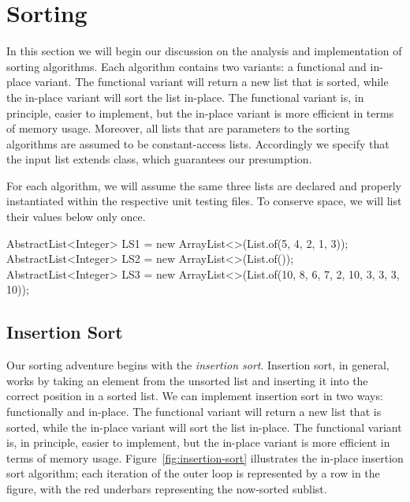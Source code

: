 \section{Sorting}
In this section we will begin our discussion on the analysis and implementation of sorting algorithms. Each algorithm contains two variants: a functional and in-place variant. The functional variant will return a new list that is sorted, while the in-place variant will sort the list in-place. The functional variant is, in principle, easier to implement, but the in-place variant is more efficient in terms of memory usage. Moreover, all lists that are parameters to the sorting algorithms are assumed to be constant-access lists. Accordingly we specify that the input list extends  class, which guarantees our presumption.

For each algorithm, we will assume the same three lists are declared and properly instantiated within the respective unit testing files. To conserve space, we will list their values below only once.

\begin{verbnobox}[\small]
AbstractList<Integer> LS1 = 
  new ArrayList<>(List.of(5, 4, 2, 1, 3));
AbstractList<Integer> LS2 = 
  new ArrayList<>(List.of());
AbstractList<Integer> LS3 = 
  new ArrayList<>(List.of(10, 8, 6, 7, 2, 10, 3, 3, 3, 10));
\end{verbnobox}

\subsection{Insertion Sort}
Our sorting adventure begins with the \emph{insertion sort}. Insertion sort, in general, works by taking an element from the unsorted list and inserting it into the correct position in a sorted list. We can implement insertion sort in two ways: functionally and in-place. The functional variant will return a new list that is sorted, while the in-place variant will sort the list in-place. The functional variant is, in principle, easier to implement, but the in-place variant is more efficient in terms of memory usage. Figure~\ref{fig:insertion-sort} illustrates the in-place insertion sort algorithm; each iteration of the outer loop is represented by a row in the figure, with the red underbars representing the now-sorted sublist.

